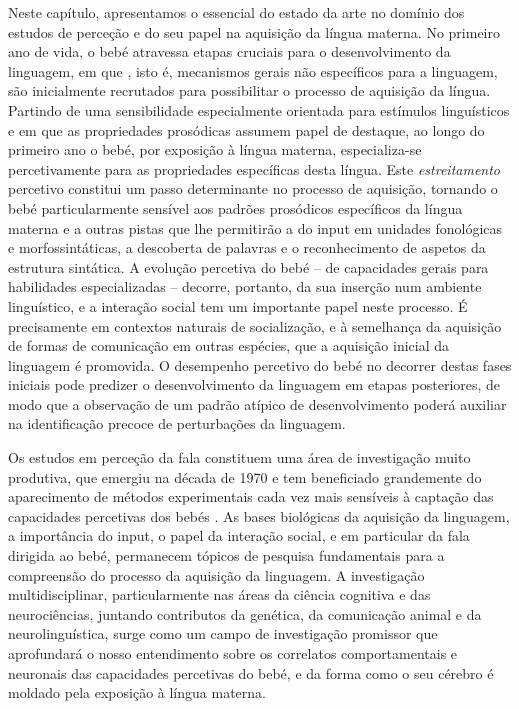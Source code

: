 \documentclass[output=paper]{LSP/langsci}
\begin{document}
Neste capítulo, apresentamos o essencial do estado da arte no domínio dos estudos de perceção e do seu papel na aquisição da língua materna. No primeiro ano de vida, o bebé atravessa etapas cruciais para o desenvolvimento da linguagem, em que , isto é, mecanismos gerais não específicos para a linguagem, são inicialmente recrutados para possibilitar o processo de aquisição da língua. Partindo de uma sensibilidade especialmente orientada para estímulos linguísticos e em que as propriedades prosódicas assumem papel de destaque, ao longo do primeiro ano o bebé, por exposição à língua materna, especializa-se percetivamente para as propriedades específicas desta língua. Este \textit{estreitamento} percetivo constitui um passo determinante no processo de aquisição, tornando o bebé particularmente sensível aos padrões prosódicos específicos da língua materna e a outras pistas que lhe permitirão a  do input em unidades fonológicas e morfossintáticas, a descoberta de palavras e o reconhecimento de aspetos da estrutura sintática. A evolução percetiva do bebé -- de capacidades gerais para habilidades especializadas -- decorre, portanto, da sua inserção num ambiente linguístico, e a interação social tem um importante papel neste processo. É precisamente em contextos naturais de socialização, e à semelhança da aquisição de formas de comunicação em outras espécies, que a aquisição inicial da linguagem é promovida. O desempenho percetivo do bebé no decorrer destas fases iniciais pode predizer o desenvolvimento da linguagem em etapas posteriores, de modo que a observação de um padrão atípico de desenvolvimento poderá auxiliar na identificação precoce de perturbações da linguagem. 

Os estudos em perceção da fala constituem uma área de investigação muito produtiva, que emergiu na década de 1970 e tem beneficiado grandemente do aparecimento de métodos experimentais cada vez mais sensíveis à captação das capacidades percetivas dos bebés \citep{gerkenaslin2005,kuhlrivera2008}. As bases biológicas da aquisição da linguagem, a importância do input, o papel da interação social, e em particular da fala dirigida ao bebé, permanecem tópicos de pesquisa fundamentais para a compreensão do processo da aquisição da linguagem. A investigação multidisciplinar, particularmente nas áreas da ciência cognitiva e das neurociências, juntando contributos da genética, da comunicação animal e da neurolinguística, surge como um campo de investigação promissor que aprofundará o nosso entendimento sobre os correlatos comportamentais e neuronais das capacidades percetivas do bebé, e da forma como o seu cérebro é moldado pela exposição à língua materna.
\end{document}

